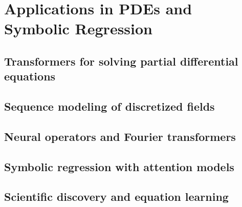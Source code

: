 \section{Applications in PDEs and Symbolic Regression}
\subsection{Transformers for solving partial differential equations}
\subsection{Sequence modeling of discretized fields}
\subsection{Neural operators and Fourier transformers}
\subsection{Symbolic regression with attention models}
\subsection{Scientific discovery and equation learning}

